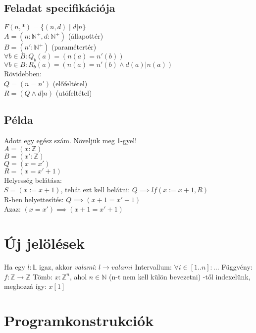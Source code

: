 \documentclass[12pt,a4paper]{article}
\begin{document}
\subsection{Feladat specifikációja}

$F(n,*) = \{(n,d) \;|\; d|n\}$\\
$A=(n:\mathbb{N}^+, d:\mathbb{N}^+)$ (állapottér)\\
$B=(n':\mathbb{N}^+)$ (paramétertér)\\
$\forall b \in B: Q_b(a) = (n(a) = n'(b))$\\
$\forall b \in B: R_b(a) = (n(a) = n'(b) \wedge d(a)|n(a))$\\
Rövidebben:\\
$Q=(n=n')$ (előfeltétel)\\
$R=(Q \wedge d|n)$ (utófeltétel)

\subsection{Példa}

Adott egy egész szám. Növeljük meg 1-gyel!\\
$A=(x:\mathbb{Z})$\\
$B=(x':\mathbb{Z})$\\
$Q=(x=x')$\\
$R=(x=x'+1)$\\
Helyesség belátása:\\
$S=(x:=x+1)$, tehát ezt kell belátni: $Q \implies lf(x:=x+1, R)$\\
R-ben helyettesítés: $Q \implies (x+1=x'+1)$\\
Azaz: $(x=x') \implies (x+1=x'+1)$

\pagebreak

\section{Új jelölések}

\begin{outline}
	\1 Ha egy $l: \mathbb{L}$ igaz, akkor \textit{valami}: $l \to valami$
	\1 Intervallum: $\forall i \in [1..n]: ...$
	\1 Függvény: $f : \mathbb{Z} \to \mathbb{Z}$
	\1 Tömb: $x:\mathbb{Z}^n$, ahol $n \in \mathbb{N}$ (n-t nem kell külön bevezetni)
		-től indexelünk, meghozzá így: $x[1]$
\end{outline}

\section{Programkonstrukciók}
\end{document}
